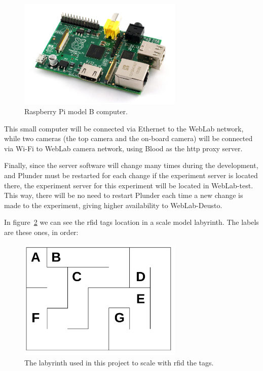 \begin{figure}[!htbp]
	\centering
	\includegraphics[width=0.7\textwidth]{fig/rasp}
	\caption{Raspberry Pi model B computer.}
	\label{fig:rasp}
\end{figure}

This small computer will be connected via Ethernet to the WebLab network, while two cameras (the top
camera and the on-board camera) will be connected via Wi-Fi to WebLab camera network, using Blood as
the \acrshort{http} proxy server.

Finally, since the server software will change many times during the development, and Plunder must
be restarted for each change if the experiment server is located there, the experiment server for
this experiment will be located in WebLab-test. This way, there will be no need to restart Plunder
each time a new change is made to the experiment, giving higher availability to WebLab-Deusto.

In figure~\ref{fig:labyrinth_diagram} we can see the \acrshort{rfid} tags location in a scale model
labyrinth. The labels are these ones, in order:

\begin{figure}[!htbp]
	\centering
	\includegraphics[width=0.7\textwidth]{fig/labyrinth-diagram}
	\caption{The labyrinth used in this project to scale with \acrshort{rfid} the tags.}
	\label{fig:labyrinth_diagram}
\end{figure}

